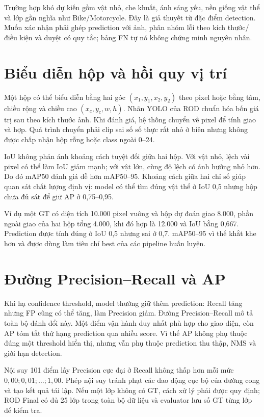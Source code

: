 \documentclass[12pt,a4paper,oneside]{report}
\begin{document}
Trường hợp khó dự kiến gồm vật nhỏ, che khuất, ánh sáng yếu, nền giống vật thể và lớp gần nghĩa như Bike/Motorcycle. Đây là giả thuyết từ đặc điểm detection. Muốn xác nhận phải ghép prediction với ảnh, phân nhóm lỗi theo kích thước/điều kiện và duyệt có quy tắc; bảng FN tự nó không chứng minh nguyên nhân.



\section{Biểu diễn hộp và hồi quy vị trí}
Một hộp có thể biểu diễn bằng hai góc $(x_1,y_1,x_2,y_2)$ theo pixel hoặc bằng tâm, chiều rộng và chiều cao $(x_c,y_c,w,h)$. Nhãn YOLO của ROD chuẩn hóa bốn giá trị sau theo kích thước ảnh. Khi đánh giá, hệ thống chuyển về pixel để tính giao và hợp. Quá trình chuyển phải clip sai số số thực rất nhỏ ở biên nhưng không được chấp nhận hộp rỗng hoặc class ngoài 0--24.

IoU không phản ánh khoảng cách tuyệt đối giữa hai hộp. Với vật nhỏ, lệch vài pixel có thể làm IoU giảm mạnh; với vật lớn, cùng độ lệch có ảnh hưởng nhỏ hơn. Do đó mAP50 đánh giá dễ hơn mAP50--95. Khoảng cách giữa hai chỉ số giúp quan sát chất lượng định vị: model có thể tìm đúng vật thể ở IoU 0,5 nhưng hộp chưa đủ sát để giữ AP ở 0,75--0,95.

Ví dụ một GT có diện tích 10.000 pixel vuông và hộp dự đoán giao 8.000, phần ngoài giao của hai hộp tổng 4.000, khi đó hợp là 12.000 và IoU bằng 0,667. Prediction được tính đúng ở IoU 0,5 nhưng sai ở 0,7. mAP50--95 vì thế khắt khe hơn và được dùng làm tiêu chí best của các pipeline huấn luyện.

\section{Đường Precision--Recall và AP}
Khi hạ confidence threshold, model thường giữ thêm prediction: Recall tăng nhưng FP cũng có thể tăng, làm Precision giảm. Đường Precision--Recall mô tả toàn bộ đánh đổi này. Một điểm vận hành duy nhất phù hợp cho giao diện, còn AP tóm tắt thứ hạng prediction qua nhiều score. Vì thế AP không phụ thuộc đúng một threshold hiển thị, nhưng vẫn phụ thuộc prediction thu thập, NMS và giới hạn detection.

Nội suy 101 điểm lấy Precision cực đại ở Recall không thấp hơn mỗi mức $0,00;0,01;\ldots;1,00$. Phép nội suy tránh phạt các dao động cục bộ của đường cong và tạo kết quả tái lập. Nếu một lớp không có GT, cách xử lý phải được quy định; ROD Final có đủ 25 lớp trong toàn bộ dữ liệu và evaluator lưu số GT từng lớp để kiểm tra.
\end{document}
